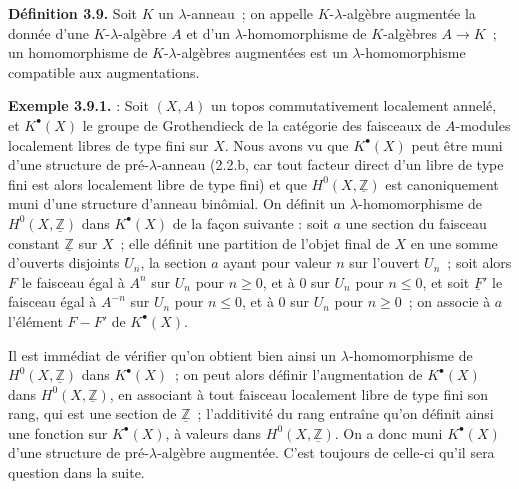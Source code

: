 \textbf{Définition 3.9.} Soit \(K\) un \(\lambda\)-anneau~; on appelle \(K\)-\(\lambda\)-algèbre augmentée la donnée d'une \(K\)-\(\lambda\)-algèbre \(A\) et d'un \(\lambda\)-homomorphisme de \(K\)-algèbres \(A\to K\)~; un homomorphisme de \(K\)-\(\lambda\)-algèbres augmentées est un \(\lambda\)-homomorphisme compatible aux augmentations.

\textbf{Exemple 3.9.1.} : Soit \((X,A)\) un topos commutativement localement annelé, et \(K^\bullet(X)\) le groupe de Grothendieck de la catégorie des faisceaux de \(A\)-modules localement libres de type fini sur \(X\). Nous avons vu que \(K^\bullet(X)\) peut être muni d'une structure de pré-\(\lambda\)-anneau (2.2.b, car tout facteur direct d'un libre de type fini est alors localement libre de type fini) et que \(H^0(X,\underline{\mathbb Z})\) est canoniquement muni d'une structure d'anneau binômial. On définit un \(\lambda\)-homomorphisme de \(H^0(X,\underline{\mathbb Z})\) dans \(K^\bullet(X)\) de la façon suivante : soit \(a\) une section du faisceau constant \(\underline{\mathbb Z}\) sur \(X\)~; elle définit une partition de l'objet final de \(X\) en une somme d'ouverts disjoints \(U_n\), la section \(a\) ayant pour valeur \(n\) sur l'ouvert \(U_n\)~; soit alors \(F\) le faisceau égal à \(A^n\) sur \(U_n\) pour \(n\ge0\), et à \(0\) sur \(U_n\) pour \(n\le0\), et soit \(\underline{F}'\) le faisceau égal à \(A^{-n}\) sur \(U_n\) pour \(n\le0\), et à \(0\) sur \(U_n\) pour \(n\ge0\)~; on associe à \(a\) l'élément \(F-F'\) de \(K^\bullet(X)\).

Il est immédiat de vérifier qu'on obtient bien ainsi un \(\lambda\)-homomorphisme de \(H^0(X,\underline{\mathbb Z})\) dans \(K^\bullet(X)\)~; on peut alors définir l'augmentation de \(K^\bullet(X)\) dans \(H^0(X,\underline{\mathbb Z})\), en associant à tout faisceau localement libre de type fini son rang, qui est une section de \(\underline{\mathbb Z}\)~; l'additivité du rang entraîne qu'on définit ainsi une fonction sur \(K^\bullet(X)\), à valeurs dans \(H^0(X,\underline{\mathbb Z})\). On a donc muni \(K^\bullet(X)\) d'une structure de pré-\(\lambda\)-algèbre augmentée. C'est toujours de celle-ci qu'il sera question dans la suite.

